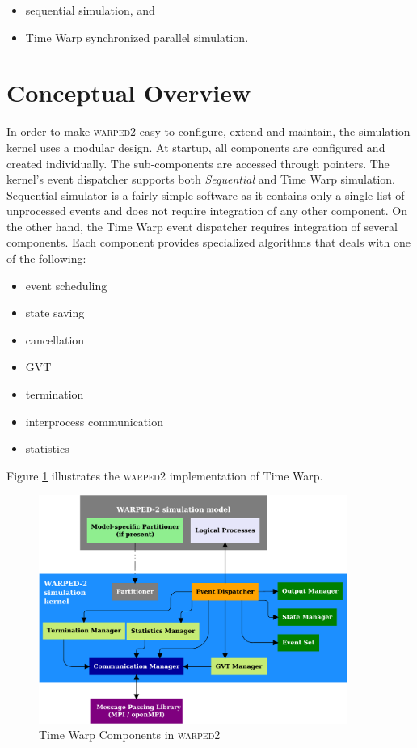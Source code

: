 \documentclass[11pt]{book}
\begin{document}
\begin{itemize}

\item sequential simulation, and 

\item Time Warp synchronized parallel simulation.

\end{itemize}

\section{Conceptual Overview}\label{sec:conceptual_overview}

In order to make \textsc{warped2} easy to configure, extend and maintain, the simulation kernel uses a modular
design.  At startup, all components are configured and created individually.  The sub-components are accessed
through pointers.  The kernel's event dispatcher supports both \emph{Sequential} and Time Warp
simulation.  Sequential simulator is a fairly simple software as it contains only a single list of unprocessed
events and does not require integration of any other component.  On the other hand, the Time Warp event
dispatcher requires integration of several components.  Each component provides specialized algorithms that
deals with one of the following:

\begin{itemize}
    \item event scheduling
    \item state saving
    \item cancellation
    \item GVT
    \item termination
    \item interprocess communication
    \item statistics
\end{itemize}

\noindent
Figure \ref{fig:warped2_architecture} illustrates the \textsc{warped2} implementation of Time Warp.

\begin{figure}
    \centering
    \includegraphics[width=0.9\textwidth]{figures/warped2_architecture.pdf}
    \caption{Time Warp Components in \textsc{warped2}}\label{fig:warped2_architecture}
\end{figure}
\end{document}
